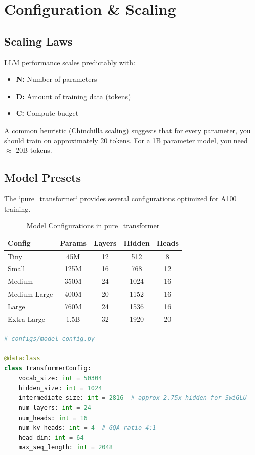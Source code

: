 \chapter{Configuration \& Scaling}

\section{Scaling Laws}
LLM performance scales predictably with:
\begin{itemize}
    \item \textbf{N:} Number of parameters
    \item \textbf{D:} Amount of training data (tokens)
    \item \textbf{C:} Compute budget
\end{itemize}

A common heuristic (Chinchilla scaling) suggests that for every parameter, you should train on approximately 20 tokens. For a 1B parameter model, you need $\approx$ 20B tokens.

\section{Model Presets}
The `pure_transformer` provides several configurations optimized for A100 training.

\begin{table}[h]
\centering
\begin{tabular}{|l|c|c|c|c|}
\hline
\textbf{Config} & \textbf{Params} & \textbf{Layers} & \textbf{Hidden} & \textbf{Heads} \\ \hline
Tiny & 45M & 12 & 512 & 8 \\ \hline
Small & 125M & 16 & 768 & 12 \\ \hline
Medium & 350M & 24 & 1024 & 16 \\ \hline
Medium-Large & 400M & 20 & 1152 & 16 \\ \hline
Large & 760M & 24 & 1536 & 16 \\ \hline
Extra Large & 1.5B & 32 & 1920 & 20 \\ \hline
\end{tabular}
\caption{Model Configurations in pure\_transformer}
\end{table}

\begin{lstlisting}[language=Python, caption=Configuration Dataclass]
# configs/model_config.py

@dataclass
class TransformerConfig:
    vocab_size: int = 50304
    hidden_size: int = 1024
    intermediate_size: int = 2816  # approx 2.75x hidden for SwiGLU
    num_layers: int = 24
    num_heads: int = 16
    num_kv_heads: int = 4  # GQA ratio 4:1
    head_dim: int = 64
    max_seq_length: int = 2048
\end{lstlisting}

